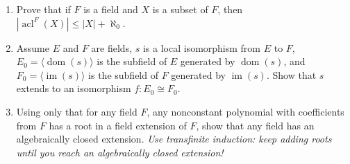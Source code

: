 \documentclass{amsart}
\theoremstyle{definition}
\newcommand{\dom}{\operatorname{dom}}
\newcommand{\im}{\operatorname{im}}
\newcommand{\acl}{\operatorname{acl}}
\begin{document}
\begin{enumerate}
\item Prove that if $F$ is a field and $X$ is a subset of $F$, then $|\acl^F (X)| \le |X| + \aleph_0$.
\item Assume $E$ and $F$ are fields, $s$ is a local isomorphism from $E$ to $F$, $E_0 = \langle \dom (s) \rangle$ is the subfield of $E$ generated by $\dom (s)$, and $F_0 = \langle \im (s) \rangle$ is the subfield of $F$ generated by $\im (s)$. Show that $s$ extends to an isomorphism $f: E_0 \cong F_0$.
\item Using only that for any field $F$, any nonconstant polynomial with coefficients from $F$ has a root in a field extension of $F$, show that any field has an algebraically closed extension. \emph{Use transfinite induction: keep adding roots until you reach an algebraically closed extension!}
\end{enumerate}


\end{document}
